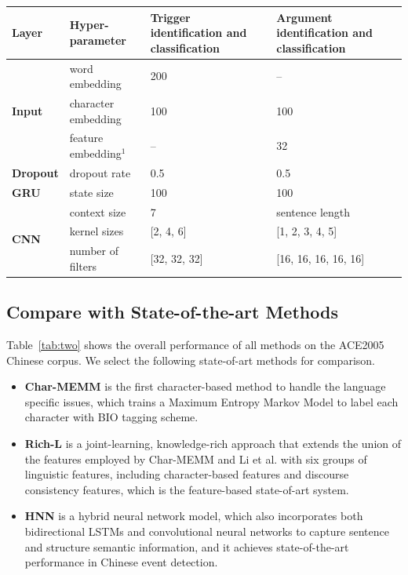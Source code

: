 \begin{table}
  {\begin{threeparttable}
\begin{tabular}{llp{}p{}} \toprule
	\textbf{Layer} & \textbf{Hyper-parameter} & \textbf{Trigger identification and classification} & \textbf{Argument identification and classification} \\
    \midrule
	\rowcolor{Gray} & word embedding & \cellcolor{Gray}200 & -- \\
    \rowcolor{Gray} \textbf{Input} & character embedding & 100 & 100 \\
    \rowcolor{Gray} & feature embedding{$^1$} & -- & 32 \\
	 \textbf{Dropout} & dropout rate & 0.5 & 0.5 \\
	\rowcolor{Gray} \textbf{GRU} & state size & 100 & 100 \\
	\multirow{3}{*}{\textbf{CNN}} & context size & 7 & sentence length \\ & kernel sizes & [2, 4, 6] & [1, 2, 3, 4, 5] \\ & number of filters & [32, 32, 32] & [16, 16, 16, 16, 16] \\
    \bottomrule
\end{tabular}
\begin{tabnote}%
\end{tabnote}%
\end{threeparttable}}
\end{table}

\subsection{Compare with State-of-the-art Methods}
Table~\ref{tab:two} shows the overall performance of all methods on the ACE2005 Chinese corpus. We select the following state-of-art methods for comparison.

\begin{itemize}
	\item \textbf{Char-MEMM} \cite{chen2009language} is the first character-based method to handle the language specific issues, which trains a Maximum Entropy Markov Model to label each character with BIO tagging scheme.
	\item \textbf{Rich-L} \cite{chen2012joint} is a joint-learning, knowledge-rich approach that extends the union of the features employed by Char-MEMM and Li et al.  with six groups of linguistic features, including character-based features and discourse consistency features, which is the feature-based state-of-art system.
	\item \textbf{HNN} \cite{feng2016language} is a hybrid neural network model, which also incorporates both bidirectional LSTMs and convolutional neural networks to capture sentence and structure semantic information, and it achieves state-of-the-art performance in Chinese event detection.
\end{itemize}

